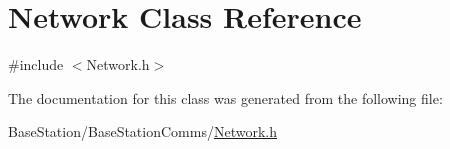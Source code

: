 \hypertarget{classNetwork}{\section{Network Class Reference}
\label{classNetwork}
}


{\ttfamily \#include $<$Network.\-h$>$}



The documentation for this class was generated from the following file\-:\begin{DoxyCompactItemize}
\item 
Base\-Station/\-Base\-Station\-Comms/\hyperlink{Network_8h}{Network.\-h}\end{DoxyCompactItemize}
